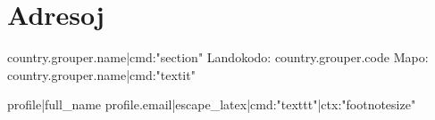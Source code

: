 {%
{ \titleformat{\section}[block]{}{}{0pt}{\centering\huge\textbf}
  \titlespacing{\section}{0pt}{4em}{1em}
  \titleformat{\subsection}[block]{}{}{0pt}{\large\textbf}
  \titlespacing{\subsection}{0pt}{2em}{1em}
  \titleformat{\subsubsection}[block]{}{}{0pt}{\small\textbf}
  \titlespacing{\subsubsection}{0pt}{0pt}{0pt}
  {%
    \part{Adresoj}
  {%

  {%

  {%
    {{ country.grouper.name|cmd:"section" }}
      {\scriptsize
        Landokodo: {{ country.grouper.code }}
          \hfill
        Mapo: {{ country.grouper.name|cmd:"textit" }}
      }
      \vspace{.7em}\nopagebreak
      {%
        {%
            {\small
            {\semibold
                {%
            }\nopagebreak
            {%
                {{ profile|full_name }}
                {{ profile.email|escape_latex|cmd:"texttt"|ctx:"footnotesize" }}
                {%
            {%
            }
        \vspace{.7em}
        {%
      {%

}}}}}}}}}}}}}}
